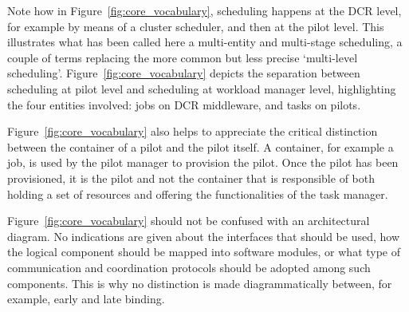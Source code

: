 \documentclass{sig-alternate}
\begin{document}

Note how in Figure~\ref{fig:core_vocabulary}, scheduling happens at the DCR
level, for example by means of a cluster scheduler, and then at the pilot level.
This illustrates what has been called here a multi-entity and multi-stage
scheduling, a couple of terms replacing the more common but less precise
`multi-level scheduling'.  Figure~\ref{fig:core_vocabulary} depicts the
separation between scheduling at pilot level and scheduling at workload manager
level, highlighting the four entities involved: jobs on DCR middleware, and
tasks on pilots.


Figure~\ref{fig:core_vocabulary} also helps to appreciate the critical
distinction between the container of a pilot and the pilot itself. A container,
for example a job, is used by the pilot manager to provision the pilot. Once the
pilot has been provisioned, it is the pilot and not the container that is
responsible of both holding a set of resources and offering the functionalities
of the task manager.


Figure~\ref{fig:core_vocabulary} should not be confused with an architectural
diagram. No indications are given about the interfaces that should be used, how
the logical component should be mapped into software modules, or what type of
communication and coordination protocols should be adopted among such
components. This is why no distinction is made diagrammatically between, for
example, early and late binding.

\end{document}

